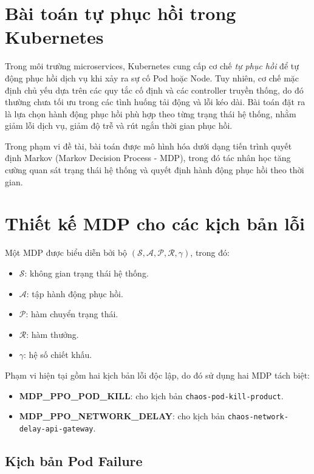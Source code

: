 \section{Bài toán tự phục hồi trong Kubernetes}

\noindent Trong môi trường microservices, Kubernetes cung cấp cơ chế \textit{tự phục hồi} để tự động phục hồi dịch vụ khi xảy ra sự cố Pod hoặc Node. Tuy nhiên, cơ chế mặc định chủ yếu dựa trên các quy tắc cố định và các controller truyền thống, do đó thường chưa tối ưu trong các tình huống tải động và lỗi kéo dài. Bài toán đặt ra là lựa chọn hành động phục hồi phù hợp theo từng trạng thái hệ thống, nhằm giảm lỗi dịch vụ, giảm độ trễ và rút ngắn thời gian phục hồi.

\noindent Trong phạm vi đề tài, bài toán được mô hình hóa dưới dạng tiến trình quyết định Markov (Markov Decision Process - MDP), trong đó tác nhân học tăng cường quan sát trạng thái hệ thống và quyết định hành động phục hồi theo thời gian.

\section{Thiết kế MDP cho các kịch bản lỗi}

\noindent Một MDP được biểu diễn bởi bộ $(\mathcal{S}, \mathcal{A}, \mathcal{P}, \mathcal{R}, \gamma)$, trong đó:
\begin{itemize}
    \item $\mathcal{S}$: không gian trạng thái hệ thống.
    \item $\mathcal{A}$: tập hành động phục hồi.
    \item $\mathcal{P}$: hàm chuyển trạng thái.
    \item $\mathcal{R}$: hàm thưởng.
    \item $\gamma$: hệ số chiết khấu.
\end{itemize}

\noindent Phạm vi hiện tại gồm hai kịch bản lỗi độc lập, do đó sử dụng hai MDP tách biệt:
\begin{itemize}
    \item \textbf{MDP\_PPO\_POD\_KILL}: cho kịch bản \texttt{chaos-pod-kill-product}.
    \item \textbf{MDP\_PPO\_NETWORK\_DELAY}: cho kịch bản \texttt{chaos-network-delay-api-gateway}.
\end{itemize}

\subsection{Kịch bản Pod Failure}

